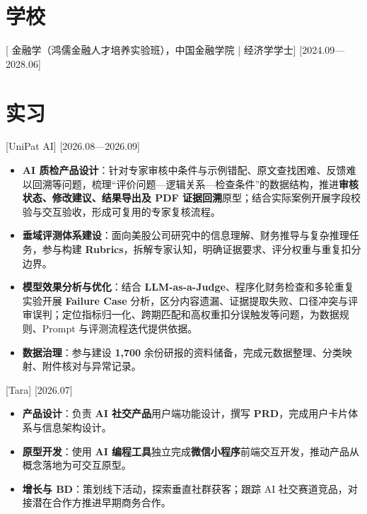 \documentclass{resume}
\begin{document}

\ResumeTitle

\section{学校}
[{ 金融学（鸿儒金融人才培养实验班），中国金融学院 | 经济学学士}]
[2024.09—2028.06]

\section{实习}

[UniPat AI]
[2026.08—2026.09]
\begin{itemize}
  \item \textbf{AI 质检产品设计}：针对专家审核中条件与示例错配、原文查找困难、反馈难以回溯等问题，梳理“评价问题—逻辑关系—检查条件”的数据结构，推进\textbf{审核状态、修改建议、结果导出及 PDF 证据回溯}原型；结合实际案例开展字段校验与交互验收，形成可复用的专家复核流程。
  \item \textbf{垂域评测体系建设}：面向美股公司研究中的信息理解、财务推导与复杂推理任务，参与构建 \textbf{Rubrics}，拆解专家认知，明确证据要求、评分权重与重复扣分边界。
  \item \textbf{模型效果分析与优化}：结合 \textbf{LLM-as-a-Judge}、程序化财务检查和多轮重复实验开展 \textbf{Failure Case} 分析，区分内容遗漏、证据提取失败、口径冲突与评审误判；定位指标归一化、跨期匹配和高权重扣分误触发等问题，为数据规则、Prompt 与评测流程迭代提供依据。
  \item \textbf{数据治理}：参与建设 \textbf{1,700} 余份研报的资料储备，完成元数据整理、分类映射、附件核对与异常记录。
\end{itemize}

[Tara]
[2026.07]
\begin{itemize}
  \item \textbf{产品设计}：负责 \textbf{AI 社交产品}用户端功能设计，撰写 \textbf{PRD}，完成用户卡片体系与信息架构设计。
  \item \textbf{原型开发}：使用 \textbf{AI 编程工具}独立完成\textbf{微信小程序}前端交互开发，推动产品从概念落地为可交互原型。
  \item \textbf{增长与 BD}：策划线下活动，探索垂直社群获客；跟踪 AI 社交赛道竞品，对接潜在合作方推进早期商务合作。
\end{itemize}
\end{document}
